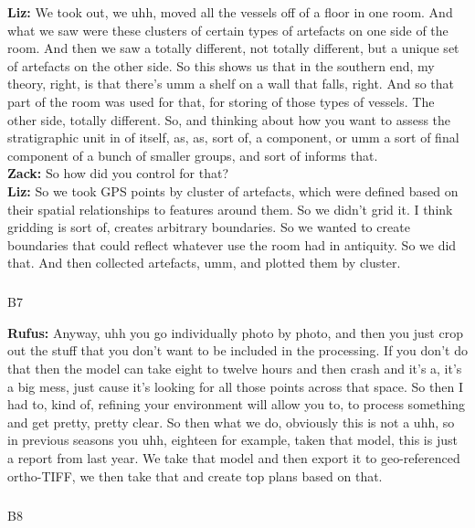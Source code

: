 \documentclass[
]{article}
\makeatletter
\let\oldsubparagraph\subparagraph
\renewcommand{\subparagraph}{
    \@ifstar
      \xxxSubParagraphStar
      \xxxSubParagraphNoStar
  }
\newcommand{\xxxSubParagraphStar}[1]{\oldsubparagraph*{#1}\mbox{}}
\newcommand{\xxxSubParagraphNoStar}[1]{\oldsubparagraph{#1}\mbox{}}
\makeatother
\begin{document}
\textbf{Liz:} We took out, we uhh, moved all the vessels off of a floor
in one room. And what we saw were these clusters of certain types of
artefacts on one side of the room. And then we saw a totally different,
not totally different, but a unique set of artefacts on the other side.
So this shows us that in the southern end, my theory, right, is that
there's umm a shelf on a wall that falls, right. And so that part of the
room was used for that, for storing of those types of vessels. The other
side, totally different. So, and thinking about how you want to assess
the stratigraphic unit in of itself, as, as, sort of, a component, or
umm a sort of final component of a bunch of smaller groups, and sort of
informs that.\\
\textbf{Zack:} So how did you control for that?\\
\textbf{Liz:} So we took GPS points by cluster of artefacts, which were
defined based on their spatial relationships to features around them. So
we didn't grid it. I think gridding is sort of, creates arbitrary
boundaries. So we wanted to create boundaries that could reflect
whatever use the room had in antiquity. So we did that. And then
collected artefacts, umm, and plotted them by cluster.

\subparagraph{B7}\label{sec-B7}

\textbf{Rufus:} Anyway, uhh you go individually photo by photo, and then
you just crop out the stuff that you don't want to be included in the
processing. If you don't do that then the model can take eight to twelve
hours and then crash and it's a, it's a big mess, just cause it's
looking for all those points across that space. So then I had to, kind
of, refining your environment will allow you to, to process something
and get pretty, pretty clear. So then what we do, obviously this is not
a uhh, so in previous seasons you uhh, eighteen for example, taken that
model, this is just a report from last year. We take that model and then
export it to geo-referenced ortho-TIFF, we then take that and create top
plans based on that.

\subparagraph{B8}\label{sec-B8}
\end{document}
